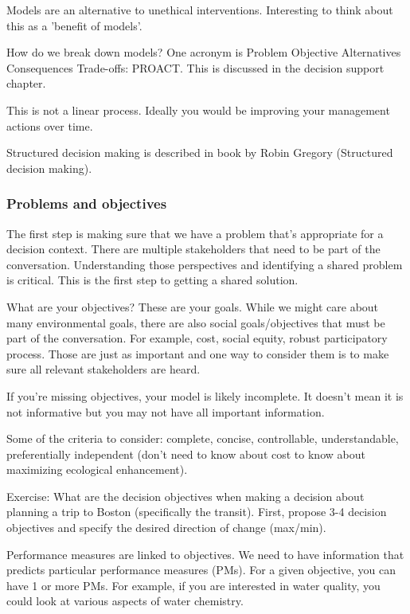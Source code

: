 \documentclass[12pt, oneside]{article}   	%
\begin{document}
Models are an alternative to unethical interventions. Interesting to think about this as a 'benefit of models'.

How do we break down models? One acronym is Problem Objective Alternatives Consequences Trade-offs: PROACT. This is discussed in the decision support chapter.

This is not a linear process. Ideally you would be improving your management actions over time. 

Structured decision making is described in book by Robin Gregory (Structured decision making).

\subsubsection{Problems and objectives}

The first step is making sure that we have a problem that's appropriate for a decision context. There are multiple stakeholders that need to be part of the conversation. Understanding those perspectives and identifying a shared problem is critical. This is the first step to getting a shared solution.

What are your objectives? These are your goals. While we might care about many environmental goals, there are also social goals/objectives that must be part of the conversation. For example, cost, social equity, robust participatory process. Those are just as important and one way to consider them is to make sure all relevant stakeholders are heard.

If you're missing objectives, your model is likely incomplete. It doesn't mean it is not informative but you may not have all important information.

Some of the criteria to consider: complete, concise, controllable, understandable, preferentially independent (don't need to know about cost to know about maximizing ecological enhancement).

Exercise: What are the decision objectives when making a decision about planning a trip to Boston (specifically the transit). First, propose 3-4 decision objectives and specify the desired direction of change (max/min).

Performance measures are linked to objectives. We need to have information that predicts particular performance measures (PMs). For a given objective, you can have 1 or more PMs. For example, if you are interested in water quality, you could look at various aspects of water chemistry.
\end{document}
